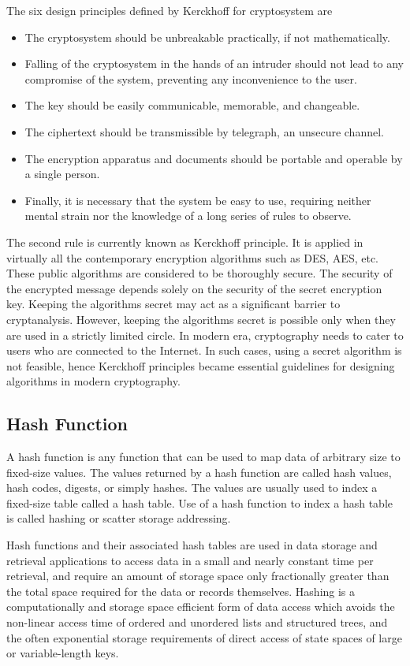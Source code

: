 \documentclass[british]{article}
\begin{document}
The six design principles defined by Kerckhoff for cryptosystem are
\textminus{}
\begin{itemize}
\item The cryptosystem should be unbreakable practically, if not mathematically.
\item Falling of the cryptosystem in the hands of an intruder should not
lead to any compromise of the system, preventing any inconvenience
to the user.
\item The key should be easily communicable, memorable, and changeable.
\item The ciphertext should be transmissible by telegraph, an unsecure channel.
\item The encryption apparatus and documents should be portable and operable
by a single person.
\item Finally, it is necessary that the system be easy to use, requiring
neither mental strain nor the knowledge of a long series of rules
to observe.
\end{itemize}
The second rule is currently known as Kerckhoff principle. It is applied
in virtually all the contemporary encryption algorithms such as DES,
AES, etc. These public algorithms are considered to be thoroughly
secure. The security of the encrypted message depends solely on the
security of the secret encryption key. Keeping the algorithms secret
may act as a significant barrier to cryptanalysis. However, keeping
the algorithms secret is possible only when they are used in a strictly
limited circle. In modern era, cryptography needs to cater to users
who are connected to the Internet. In such cases, using a secret algorithm
is not feasible, hence Kerckhoff principles became essential guidelines
for designing algorithms in modern cryptography.

\subsection{Hash Function}

A hash function is any function that can be used to map data of arbitrary
size to fixed-size values. The values returned by a hash function
are called hash values, hash codes, digests, or simply hashes. The
values are usually used to index a fixed-size table called a hash
table. Use of a hash function to index a hash table is called hashing
or scatter storage addressing.

Hash functions and their associated hash tables are used in data storage
and retrieval applications to access data in a small and nearly constant
time per retrieval, and require an amount of storage space only fractionally
greater than the total space required for the data or records themselves.
Hashing is a computationally and storage space efficient form of data
access which avoids the non-linear access time of ordered and unordered
lists and structured trees, and the often exponential storage requirements
of direct access of state spaces of large or variable-length keys.
\end{document}

